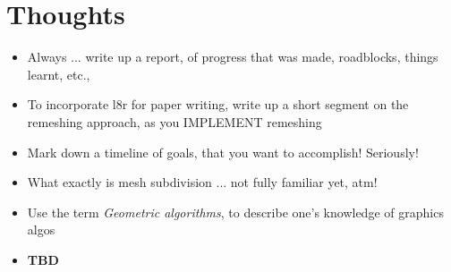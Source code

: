 \documentclass{article}
\begin{document}
\section{Thoughts}
\begin{itemize}
	\item Always ... write up a report, of progress that was made, roadblocks, things learnt, etc., 
	\item To incorporate l8r for paper writing, write up a short segment on the remeshing approach, as you IMPLEMENT remeshing
	\item Mark down a timeline of goals, that you want to accomplish! Seriously!
	\item What exactly is mesh subdivision ... not fully familiar yet, atm!
	\item Use the term \textit{Geometric algorithms}, to describe one's knowledge of graphics algos
	\item \textbf{TBD} 
\end{itemize}
\end{document}
